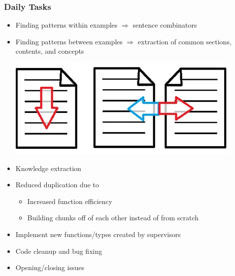 \documentclass{beamer}
\begin{document}
\begin{frame}
\frametitle{Daily Tasks}
\begin{itemize}
 \item Finding patterns within examples $\Rightarrow$ sentence combinators
 \item Finding patterns between examples $\Rightarrow$ extraction of common sections, contents, and concepts
 \begin{center}
  \includegraphics[scale=0.6]{../WG2_11/WinAndBwExamples.jpg}
 \end{center}
 \item Knowledge extraction
 \item Reduced duplication due to
  \begin{itemize}
   \item Increased function efficiency
   \item Building chunks off of each other instead of from scratch
  \end{itemize}
 \item<1-> Implement new functions/types created by supervisors
 \item<2-> Code cleanup and bug fixing
 \item<3-> Opening/closing issues
\end{itemize}
\end{frame}
\end{document}
